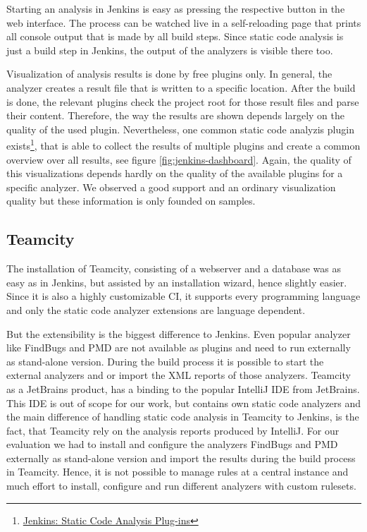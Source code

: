 \documentclass[conference]{IEEEtran}
\begin{document}
Starting an analysis in Jenkins is easy as pressing the respective button in the web interface. The process can be watched live in a self-reloading page that prints all console output that is made by all build steps. Since static code analysis is just a build step in Jenkins, the output of the analyzers is visible there too.

Visualization of analysis results is done by free plugins only. In general, the analyzer creates a result file that is written to a specific location. After the build is done, the relevant plugins check the project root for those result files and parse their content. Therefore, the way the results are shown depends largely on the quality of the used plugin. Nevertheless, one common static code analyzis plugin exists\footnote{\href{https://wiki.jenkins-ci.org/display/JENKINS/Static+Code+Analysis+Plug-ins}{Jenkins: Static Code Analysis Plug-ins}}, that is able to collect the results of multiple plugins and create a common overview over all results, see figure \ref{fig:jenkins-dashboard}. Again, the quality of this visualizations depends hardly on the quality of the available plugins for a specific analyzer. We observed a good support and an ordinary visualization quality but these information is only founded on samples.




\subsection{Teamcity}
\label{subsec:evaluation_teamcity}


The installation of Teamcity, consisting of a webserver and a database was as easy as in Jenkins, but assisted by an installation wizard, hence slightly easier. 
Since it is also a highly customizable CI, it supports every programming language and only the static code analyzer extensions are language dependent.


But the extensibility is the biggest difference to Jenkins.
Even popular analyzer like FindBugs and PMD are not available as plugins and need to run externally as stand-alone version.
During the build process it is possible to start the external analyzers and or import the XML reports of those analyzers.
Teamcity as a JetBrains product, has a binding to the popular IntelliJ IDE from JetBrains.
This IDE is out of scope for our work, but contains own static code analyzers and the main difference of handling static code analysis in Teamcity to Jenkins, is the fact, that Teamcity rely on the analysis reports produced by IntelliJ. 
For our evaluation we had to install and configure the analyzers FindBugs and PMD externally as stand-alone version and import the results during the build process in Teamcity.
Hence, it is not possible to manage rules at a central instance and much effort to install, configure and run different analyzers with custom rulesets.
\end{document}
